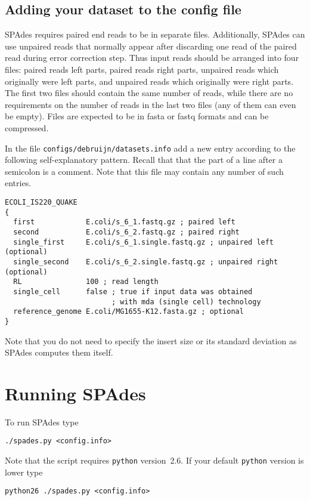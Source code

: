 \documentclass{article}
\def\spades{SPAdes}
\def\bh{BayesHammer}
\begin{document}

\subsection{Adding your dataset to the config file}\label{subsec:datasets}
{\spades} requires paired end reads to be in separate files.
Additionally, {\spades} can use unpaired reads that normally appear after discarding one read of the paired read during error correction step.
Thus input reads should be arranged into four files: paired reads left parts, paired reads right parts, unpaired reads which originally were left parts, and
unpaired reads which originally were right parts. The first two files should contain the same number of reads, while
there are no requirements on the number of reads in the last two files (any of them can even be empty).
Files are expected to be in fasta or fastq formats and can be compressed.

In the file {\tt configs/debruijn/datasets.info} add a new entry according to the following self-explanatory pattern.  Recall that
that the part of a line after a semicolon is a comment. Note that this file may contain any number of such entries.
\begin{lstlisting}
ECOLI_IS220_QUAKE
{
  first            E.coli/s_6_1.fastq.gz ; paired left
  second           E.coli/s_6_2.fastq.gz ; paired right
  single_first     E.coli/s_6_1.single.fastq.gz ; unpaired left (optional)
  single_second    E.coli/s_6_2.single.fastq.gz ; unpaired right (optional)
  RL               100 ; read length
  single_cell      false ; true if input data was obtained 
                         ; with mda (single cell) technology
  reference_genome E.coli/MG1655-K12.fasta.gz ; optional
}
\end{lstlisting}
Note that you do not need to specify the insert size or its standard deviation as {\spades}
computes them itself.

\section{Running {\spades}}\label{sec:running}
To run {\spades} type
\begin{lstlisting}
./spades.py <config.info>
\end{lstlisting}
Note that the script requires {\tt python} version~2.6.
If your default {\tt python} version is lower  type
\begin{lstlisting}
python26 ./spades.py <config.info>
\end{lstlisting}
\end{document}
